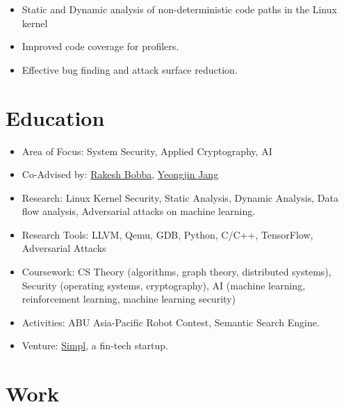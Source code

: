 \documentclass[11pt,a4paper,sans]{moderncv}
\begin{document}
{
    \begin{itemize}
        \item Static and Dynamic analysis of non-deterministic code paths in the
        Linux kernel
        \item Improved code coverage for profilers.
        \item Effective bug finding and attack surface reduction.
    \end{itemize}
}

\section{Education}
{
    \begin{itemize}
    \item Area of Focus: System Security, Applied Cryptography, AI
    \item Co-Advised by:
    \href{https://eecs.oregonstate.edu/people/bobba-rakesh}{Rakesh Bobba},
    \href{https://www.unexploitable.systems/}{Yeongjin Jang}
    \item Research: Linux Kernel Security, Static Analysis, Dynamic Analysis,
    Data flow analysis, Adversarial attacks on machine learning.
    \item Research Tools: LLVM, Qemu, GDB, Python, C/C++, TensorFlow, Adversarial Attacks
    \item Coursework: CS Theory (algorithms, graph theory, distributed systems),
    Security (operating systems, cryptography), AI (machine learning,
    reinforcement learning, machine learning security)
    \end{itemize}
}
{
    \begin{itemize}
    \item Activities: ABU Asia-Pacific Robot Contest, Semantic Search Engine.
    \item Venture: \href{https://www.getsimpl.com}{Simpl}, a fin-tech startup.
    \end{itemize}
}

\section{Work}
\end{document}
